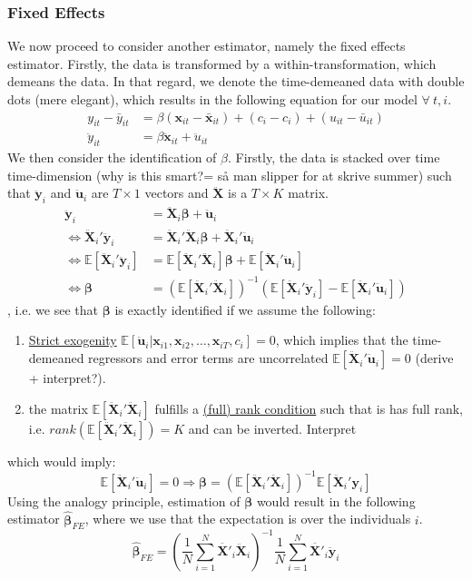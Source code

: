 \subsubsection*{Fixed Effects}
We now proceed to consider another estimator, namely the fixed effects estimator. Firstly, the data is transformed by a within-transformation, which demeans the data. In that regard, we denote the time-demeaned data with double dots (mere elegant), which results in the following equation for our model $\forall \ t,i$.
\begin{align*}
    y_{it}-\bar{y}_{it} &= \beta(\pmb{x}_{it}-\bar{\pmb{x}}_{it})+(c_i-c_i)+(u_{it} - \bar{u}_{it}) \\
    \ddot{y}_{it} &= \beta \ddot{\pmb{x}}_{it}+\ddot{u}_{it}
\end{align*}
We then consider the identification of $\beta$. Firstly, the data is stacked over time time-dimension (why is this smart?= så man slipper for at skrive summer) such that $\ddot{\pmb{y}}_{i}$ and $\ddot{\pmb{u}}_{i}$ are $T \times 1$ vectors and $\pmb{\ddot{X}}$ is a $T\times K$ matrix.
\begin{align*}
    \ddot{\pmb{y}}_{i} &= \pmb{\ddot{X}}_{i} \pmb{\beta}  +\pmb{\ddot{u}}_{i} \\
    \Leftrightarrow \pmb{\ddot{X}}_{i}'\ddot{\pmb{y}}_{i}&=\pmb{\ddot{X}}_{i}'\pmb{\ddot{X}}_{i}\pmb{\beta} +\pmb{\ddot{X}}_{i}'\pmb{\ddot{u}}_{i} \\
    \Leftrightarrow \mathbb{E}[\pmb{\ddot{X}}_{i}'\pmb{\ddot{y}}_{i}] &=\mathbb{E}[\pmb{\ddot{X}}_{i}'\pmb{\ddot{X}}_{i}] \pmb{\beta}  + \mathbb{E}[\pmb{\ddot{X}}_{i}'\pmb{\ddot{u}}_{i}] \\ \Leftrightarrow  \pmb{\beta} &= (\mathbb{E}[\pmb{\ddot{X}}_{i}'\pmb{\ddot{X}}_{i}])^{-1} \left(  \mathbb{E}[\pmb{\ddot{X}}_{i}'\pmb{\ddot{y}}_{i}]-\mathbb{E}[\pmb{\ddot{X}}_{i}' \pmb{\ddot{u}}_{i}]\right)
\end{align*}
, i.e. we see that $\pmb{\beta}$ is exactly identified if we assume the following:
\begin{enumerate}
    \item \underline{Strict exogenity} $\mathbb{E}[\pmb{\ddot{u}}_{i}\vert \pmb{x}_{i1},\pmb{x}_{i2},\dots,\pmb{x}_{iT},c_i]=0$, which implies that the time-demeaned regressors and error terms are uncorrelated $\mathbb{E}[\pmb{\ddot{X}}_{i}' \pmb{\ddot{u}}_{i}]=0$ (derive + interpret?). 
    \item the matrix $\mathbb{E}[\pmb{\ddot{X}}_{i}'\pmb{\ddot{X}}_{i}]$ fulfills a \underline{ (full) rank condition} such that is has full rank, i.e. $rank(\mathbb{E}[\pmb{\ddot{X}}_{i}'\pmb{\ddot{X}}_{i}])=K$ and can be inverted. Interpret
\end{enumerate}
which would imply:
$$\mathbb{E}[\pmb{\ddot{X}}_{i}' \pmb{\ddot{u}}_{i}]= 0\Rightarrow \pmb{\beta} = (\mathbb{E}[\pmb{\ddot{X}}_{i}'\pmb{\ddot{X}}_{i}])^{-1} \mathbb{E}[\pmb{\ddot{X}}_{i}'\pmb{y}_{i}]$$
Using the analogy principle, estimation of $\pmb{\beta}$ would result in the following estimator $\pmb{\hat{\beta}}_{FE}$, where we use that the expectation is over the individuals $i$.
$$\pmb{\hat{\beta}}_{FE}= \left( \frac{1}{N} \sum_{i=1}^N {\pmb{\ddot{X'}}_{i} \pmb{\ddot{X}}_{i} } \right) ^{-1}\frac{1}{N} \sum_{i=1}^N {\pmb{\ddot{X'}}_{i} \pmb{\ddot{y}}_{i} }$$

